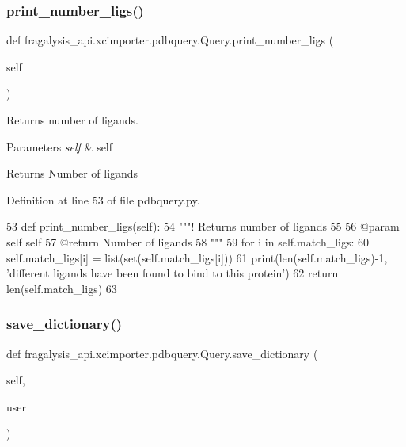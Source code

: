 \subsubsection{\texorpdfstring{print\+\_\+number\+\_\+ligs()}{print\_number\_ligs()}}
{\footnotesize\ttfamily def fragalysis\+\_\+api.\+xcimporter.\+pdbquery.\+Query.\+print\+\_\+number\+\_\+ligs (\begin{DoxyParamCaption}\item[{}]{self }\end{DoxyParamCaption})}



Returns number of ligands. 


\begin{DoxyParams}{Parameters}
{\em self} & self \\
\hline
\end{DoxyParams}
\begin{DoxyReturn}{Returns}
Number of ligands 
\end{DoxyReturn}


Definition at line 53 of file pdbquery.\+py.


\begin{DoxyCode}
53     \textcolor{keyword}{def }print\_number\_ligs(self):
54         \textcolor{stringliteral}{"""! Returns number of ligands}
55 \textcolor{stringliteral}{}
56 \textcolor{stringliteral}{        @param self self}
57 \textcolor{stringliteral}{        @return Number of ligands}
58 \textcolor{stringliteral}{        """}
59         \textcolor{keywordflow}{for} i \textcolor{keywordflow}{in} self.match\_ligs:
60             self.match\_ligs[i] = list(set(self.match\_ligs[i]))
61         print(len(self.match\_ligs)-1, \textcolor{stringliteral}{'different ligands have been found to bind to this protein'})
62         \textcolor{keywordflow}{return} len(self.match\_ligs)
63 
\end{DoxyCode}
\mbox{\label{classfragalysis__api_1_1xcimporter_1_1pdbquery_1_1_query_a42babe6a340aaf0b2dcc84ea5d0c0b11}} 
\subsubsection{\texorpdfstring{save\+\_\+dictionary()}{save\_dictionary()}}
{\footnotesize\ttfamily def fragalysis\+\_\+api.\+xcimporter.\+pdbquery.\+Query.\+save\+\_\+dictionary (\begin{DoxyParamCaption}\item[{}]{self,  }\item[{}]{user }\end{DoxyParamCaption})}




